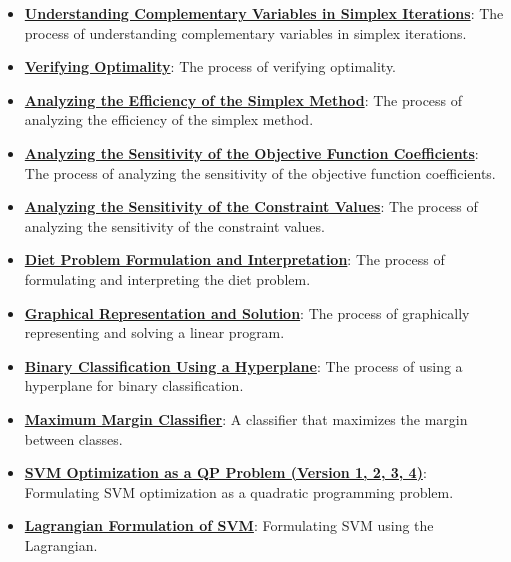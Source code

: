 \documentclass{article}%
\begin{document}
\begin{itemize}[leftmargin=*]
\item \href{https://www.math.purdue.edu/~yipn/421/2024-11-14-NetAppls.pdf#page=7}{\textbf{Understanding Complementary Variables in Simplex Iterations}}: The process of understanding complementary variables in simplex iterations.%
\item \href{https://www.math.purdue.edu/~yipn/421/2024-11-14-NetAppls.pdf#page=7}{\textbf{Verifying Optimality}}: The process of verifying optimality.%
\item \href{https://www.math.purdue.edu/~yipn/421/2024-11-14-NetAppls.pdf#page=7}{\textbf{Analyzing the Efficiency of the Simplex Method}}: The process of analyzing the efficiency of the simplex method.%
\item \href{https://www.math.purdue.edu/~yipn/421/2024-11-14-NetAppls.pdf#page=7}{\textbf{Analyzing the Sensitivity of the Objective Function Coefficients}}: The process of analyzing the sensitivity of the objective function coefficients.%
\item \href{https://www.math.purdue.edu/~yipn/421/2024-11-14-NetAppls.pdf#page=7}{\textbf{Analyzing the Sensitivity of the Constraint Values}}: The process of analyzing the sensitivity of the constraint values.%
\item \href{https://www.math.purdue.edu/~yipn/421/2024-11-14-NetAppls.pdf#page=7}{\textbf{Diet Problem Formulation and Interpretation}}: The process of formulating and interpreting the diet problem.%
\item \href{https://www.math.purdue.edu/~yipn/421/2024-11-14-NetAppls.pdf#page=7}{\textbf{Graphical Representation and Solution}}: The process of graphically representing and solving a linear program.%
\item \href{https://www.math.purdue.edu/~yipn/421/2024-11-14-NetAppls.pdf#page=7}{\textbf{Binary Classification Using a Hyperplane}}: The process of using a hyperplane for binary classification.%
\item \href{https://www.math.purdue.edu/~yipn/421/2024-11-14-NetAppls.pdf#page=7}{\textbf{Maximum Margin Classifier}}: A classifier that maximizes the margin between classes.%
\item \href{https://www.math.purdue.edu/~yipn/421/2024-11-14-NetAppls.pdf#page=7}{\textbf{SVM Optimization as a QP Problem (Version 1, 2, 3, 4)}}: Formulating SVM optimization as a quadratic programming problem.%
\item \href{https://www.math.purdue.edu/~yipn/421/2024-11-14-NetAppls.pdf#page=7}{\textbf{Lagrangian Formulation of SVM}}: Formulating SVM using the Lagrangian.%

\end{itemize}
\end{document}
